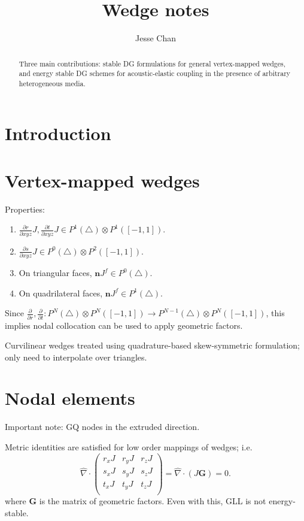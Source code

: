 \documentclass{siamart0216}
\date{}
\author{Jesse Chan}
\title{Wedge notes}
\newcommand{\pd}[2]{\frac{\partial#1}{\partial#2}}
\newcommand{\LRp}[1]{\left( #1 \right)}
\newcommand{\Grad} {\ensuremath{\nabla}}
\begin{document}
\maketitle

\begin{abstract}
Three main contributions: stable DG formulations for general vertex-mapped wedges, and energy stable DG schemes for acoustic-elastic coupling in the presence of arbitrary heterogeneous media.  
\end{abstract}

\tableofcontents

\section{Introduction}

\section{Vertex-mapped wedges}

Properties: 
\begin{enumerate}
\item $\pd{r}{xyz} J, \pd{t}{xyz} J \in P^1(\triangle) \otimes P^1([-1,1])$.  
\item $\pd{s}{xyz} J \in P^0(\triangle) \otimes P^2([-1,1])$.  
\item On triangular faces, $\bm{n} J^f \in P^0(\triangle)$.  
\item On quadrilateral faces, $\bm{n} J^f \in P^1(\triangle)$.  
\end{enumerate}

Since $\pd{}{r},\pd{}{t}: P^N(\triangle)\otimes P^N([-1,1]) \rightarrow P^{N-1}(\triangle)\otimes P^N([-1,1])$, this implies nodal collocation can be used to apply geometric factors.  

Curvilinear wedges treated using quadrature-based skew-symmetric formulation; only need to interpolate over triangles.  

\section{Nodal elements}

Important note: GQ nodes in the extruded direction.  

Metric identities are satisfied for low order mappings of wedges; i.e. 
\[
\widehat{\Grad}\cdot \LRp{
\begin{array}{ccc}
r_x J & r_y J & r_z J\\
s_x J & s_y J & s_z J\\
t_x J & t_y J & t_z J\\
\end{array}
} = \widehat{\Grad}\cdot (J\bm{G}) = 0.
\]
where $\bm{G}$ is the matrix of geometric factors.  Even with this, GLL is not energy-stable.  
\end{document}
